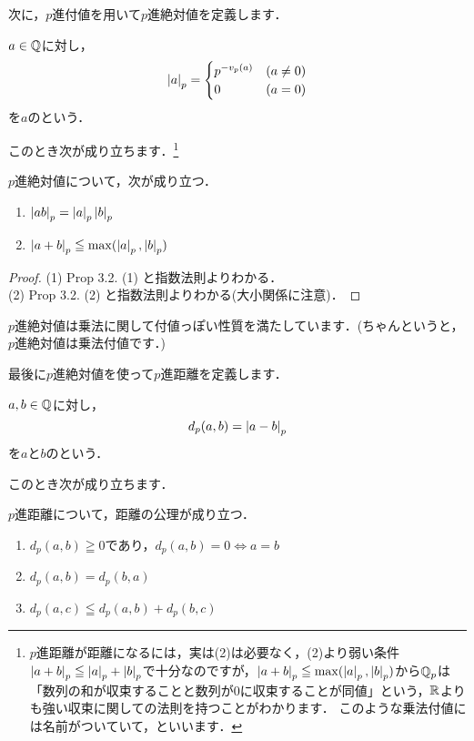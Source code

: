 \documentclass[./main]{subfiles}
\begin{document}
次に，$p$進付値を用いて$p$進絶対値を定義します．

\begin{defi}
$a \in \mathbb{Q}$に対し，
\begin{equation*}
\left\lvert a\right\rvert_p= \begin{cases}
	p^{-v_p(a)} &(a \neq 0)\\
	0 &(a=0)
	\end{cases}
\end{equation*}
を$a$のという．
\end{defi}

このとき次が成り立ちます．\footnote{$p$進距離が距離になるには，実は(2)は必要なく，(2)より弱い条件$\left\lvert a+b\right\rvert_p \leqq \left\lvert a\right\rvert_p+\left\lvert b\right\rvert_p$で十分なのですが，$\left\lvert a+b\right\rvert_p \leqq \max(\left\lvert a\right\rvert_p,\left\lvert b\right\rvert_p)$から$\mathbb{Q}_p$は「数列の和が収束することと数列が0に収束することが同値」という，$\mathbb{R}$よりも強い収束に関しての法則を持つことがわかります．
このような乗法付値には名前がついていて，といいます．}
\begin{prop}
$p$進絶対値について，次が成り立つ．
\begin{enumerate}
  \renewcommand{\labelenumi}{(\arabic{enumi})}
\item $\left\lvert ab\right\rvert_p=\left\lvert a\right\rvert_p \left\lvert b\right\rvert_p$
\item $\left\lvert a+b\right\rvert_p \leqq \max(\left\lvert a\right\rvert_p,\left\lvert b\right\rvert_p)$
\end{enumerate}
\end{prop}

\begin{proof}
	(1) Prop 3.2. (1) と指数法則よりわかる．\\
	(2) Prop 3.2. (2) と指数法則よりわかる(大小関係に注意)．
\end{proof}


$p$進絶対値は乗法に関して付値っぽい性質を満たしています．(ちゃんというと，$p$進絶対値は乗法付値です．)

最後に$p$進絶対値を使って$p$進距離を定義します．

\begin{defi}
$a,b \in \mathbb{Q}$に対し，
\begin{equation*}
d_p(a,b)=\left\lvert a-b\right\rvert_p
\end{equation*}
を$a$と$b$のという．
\end{defi}

このとき次が成り立ちます．
\begin{theo}
$p$進距離について，距離の公理が成り立つ．
\begin{enumerate}
  \renewcommand{\labelenumi}{(\arabic{enumi})}
\item $d_p(a,b) \geqq	0$であり，$d_p(a,b)=0 \Longleftrightarrow a=b$ 
\item $d_p(a,b)=d_p(b,a)$ 
\item $d_p(a,c) \leqq d_p(a,b) +d_p(b,c)$
\end{enumerate}
\end{theo}
\end{document}

